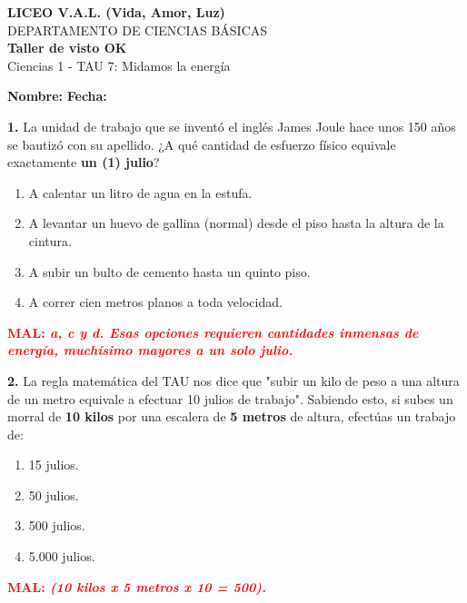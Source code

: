 \documentclass[12pt, letterpaper]{article}
\newif\ifshowanswers
\newcommand{\retroalimentacion}[3]{
	\ifshowanswers
	\vspace{0.2cm}
	\noindent\textcolor{gray}{\rule{\textwidth}{2pt}} %
	\par\vspace{0.1cm}
	\noindent \textbf{\textcolor{blue}{BIEN: #1 \quad \textit{(#2)}}}
	
	\if\relax\detokenize{#3}\relax
	\else
	\par\vspace{0.1cm}
	\noindent \textbf{\textcolor{red}{MAL: \textit{#3}}}
	\fi
	\vspace{0.6cm}
	\else
	\vspace{1.2cm} %
	\fi
}
\begin{document}
	
	\begin{center}
		{\Large \textbf{LICEO V.A.L. (Vida, Amor, Luz)}}\\[0.1cm]
		{\large DEPARTAMENTO DE CIENCIAS BÁSICAS}\\[0.1cm]
		\textbf{Taller de visto OK} \\[0.1cm]
		Ciencias 1 - TAU 7: Midamos la energía
	\end{center}
	
	\vspace{0.3cm}
	\noindent \textbf{Nombre:} \underline{\hspace{8cm}} \hspace{1cm}\textbf{Fecha:} \underline{\hspace{3cm}}
	
	\vspace{0.5cm}
	
	\noindent \textbf{1.} La unidad de trabajo que se inventó el inglés James Joule hace unos 150 años se bautizó con su apellido. ¿A qué cantidad de esfuerzo físico equivale exactamente \textbf{un (1) julio}?
	\begin{enumerate}[label=\alph*)]
		\item A calentar un litro de agua en la estufa.
		\item A levantar un huevo de gallina (normal) desde el piso hasta la altura de la cintura.
		\item A subir un bulto de cemento hasta un quinto piso.
		\item A correr cien metros planos a toda velocidad.
	\end{enumerate}
	\retroalimentacion{b}{Ese es un trabajo fácil de ver y medir. Un huevo pesa más o menos la décima parte de un kilo (100 gramos), y al subirlo 1 metro hacemos 1 julio de trabajo.}{a, c y d. Esas opciones requieren cantidades inmensas de energía, muchísimo mayores a un solo julio.}
	
	\noindent \textbf{2.} La regla matemática del TAU nos dice que "subir un kilo de peso a una altura de un metro equivale a efectuar 10 julios de trabajo". Sabiendo esto, si subes un morral de \textbf{10 kilos} por una escalera de \textbf{5 metros} de altura, efectúas un trabajo de:
	\begin{enumerate}[label=\alph*)]
		\item 15 julios.
		\item 50 julios.
		\item 500 julios.
		\item 5.000 julios.
	\end{enumerate}
	\retroalimentacion{c}{10 kilos equivalen a unos 100 huevos. Por cada metro que subes esos 10 kilos, haces un trabajo de 100 julios. Como son 5 metros: 100 x 5 = 500 julios.}{(10 kilos x 5 metros x 10 = 500).}
	
\end{document}
